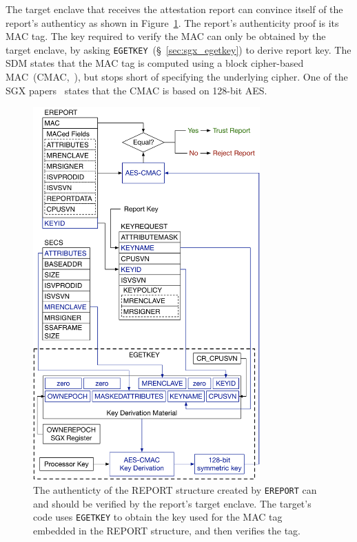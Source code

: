 
The target enclave that receives the attestation report can convince itself of
the report's authenticy as shown in Figure~\ref{fig:sgx_ereport_check}. The
report's authenticity proof is its MAC tag. The key required to verify the MAC
can only be obtained by the target enclave, by asking
\texttt{EGETKEY}~(\S~\ref{sec:sgx_egetkey}) to derive report key. The SDM
states that the MAC tag is computed using a block cipher-based
MAC~(CMAC,~\cite{fips2005cmac}), but stops short of specifying the underlying
cipher. One of the SGX papers~\cite{anati2013sgx} states that the CMAC is based
on 128-bit AES.

\begin{figure}[hbt]
  \centering
  \includegraphics[width=87mm]{figures/sgx_ereport_check.pdf}
  \caption{
    The authenticty of the REPORT structure created by \texttt{EREPORT} can and
    should be verified by the report's target enclave. The target's code uses
    \texttt{EGETKEY} to obtain the key used for the MAC tag embedded in the
    REPORT structure, and then verifies the tag.
  }
  \label{fig:sgx_ereport_check}
\end{figure}

